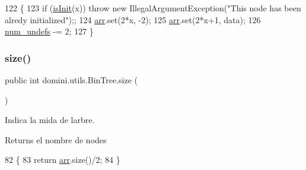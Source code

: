 \begin{DoxyCode}
122                                          \{
123         \textcolor{keywordflow}{if} (\hyperlink{classdomini_1_1utils_1_1BinTree_aefcc4df5059f9893eba9998cb267eced}{isInit}(x)) \textcolor{keywordflow}{throw} \textcolor{keyword}{new} IllegalArgumentException(\textcolor{stringliteral}{"This node has been alredy initialized"});;
124         \hyperlink{classdomini_1_1utils_1_1BinTree_a357bcbcf07ba7fcb99d11b237d189e65}{arr}.set(2*x, -2);
125         \hyperlink{classdomini_1_1utils_1_1BinTree_a357bcbcf07ba7fcb99d11b237d189e65}{arr}.set(2*x+1, data);
126         \hyperlink{classdomini_1_1utils_1_1BinTree_a36f1212262c353accbc0a0385fa45a8d}{num\_undefs} -= 2;
127     \}
\end{DoxyCode}
\mbox{\label{classdomini_1_1utils_1_1BinTree_afb98cb560c437784fe3ce1b8d6aa046e}} 
\subsubsection{\texorpdfstring{size()}{size()}}
{\footnotesize\ttfamily public int domini.\+utils.\+Bin\+Tree.\+size (\begin{DoxyParamCaption}{ }\end{DoxyParamCaption})\hspace{0.3cm}{\ttfamily [inline]}}



Indica la mida de l\textquotesingle{}arbre. 

\begin{DoxyReturn}{Returns}
el nombre de nodes 
\end{DoxyReturn}

\begin{DoxyCode}
82                       \{
83         \textcolor{keywordflow}{return} \hyperlink{classdomini_1_1utils_1_1BinTree_a357bcbcf07ba7fcb99d11b237d189e65}{arr}.size()/2;
84     \}
\end{DoxyCode}
\mbox{\label{classdomini_1_1utils_1_1BinTree_a30f097b37ebea20379d9c2930e8fa27f}} 
